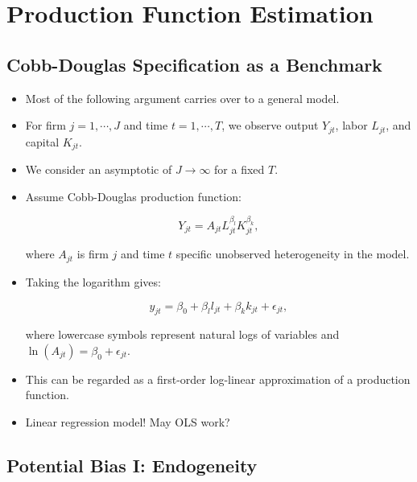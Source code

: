 \documentclass[]{book}
\providecommand{\tightlist}{%
  \setlength{\itemsep}{0pt}\setlength{\parskip}{0pt}}
\begin{document}
\section{Production Function
Estimation}\label{production-function-estimation}

\subsection{Cobb-Douglas Specification as a
Benchmark}\label{cobb-douglas-specification-as-a-benchmark}

\begin{itemize}
\tightlist
\item
  Most of the following argument carries over to a general model.
\item
  For firm \(j = 1, \cdots, J\) and time \(t = 1, \cdots, T\), we
  observe output \(Y_{jt}\), labor \(L_{jt}\), and capital \(K_{jt}\).
\item
  We consider an asymptotic of \(J \to \infty\) for a fixed \(T\).
\item
  Assume Cobb-Douglas production function:

  \begin{equation}
  Y_{jt} = A_{jt}  L_{jt}^{\beta_l} K_{jt}^{\beta_k},
  \end{equation}

  where \(A_{jt}\) is firm \(j\) and time \(t\) specific unobserved
  heterogeneity in the model.
\item
  Taking the logarithm gives:

  \begin{equation}
  y_{jt} = \beta_0 + \beta_l l_{jt} + \beta_k k_{jt} + \epsilon_{jt},
  \end{equation}

  where lowercase symbols represent natural logs of variables and
  \(\ln(A_{jt}) = \beta_0 + \epsilon_{jt}\).
\item
  This can be regarded as a first-order log-linear approximation of a
  production function.
\item
  Linear regression model! May OLS work?
\end{itemize}

\subsection{Potential Bias I:
Endogeneity}\label{potential-bias-i-endogeneity}
\end{document}

